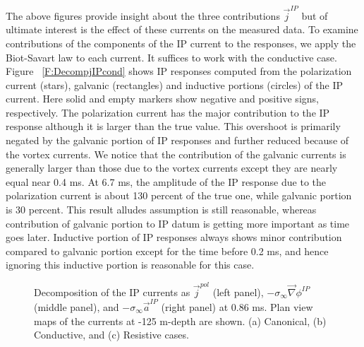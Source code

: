 \documentclass[extra,mreferee]{gji}
\newcommand{\grad}{\vec \nabla}
\newcommand{\siginf}{\sigma_\infty}
\renewcommand {\j}  { {\vec j} }
\begin{document}
The above figures provide insight about the three contributions $\j^{IP}$ but of ultimate interest is the effect of these currents on the measured data. 
To examine contributions of the components of the IP current to the responses, we apply the Biot-Savart law to each current. It suffices to work with the conductive case. 
Figure ~\ref{F:DecompjIPcond} shows IP responses computed from the polarization current (stars), galvanic (rectangles) and inductive portions (circles) of the IP current. Here solid and empty markers show negative and positive signs, respectively. 
The polarization current has the major contribution to the IP response although it is larger than the true value. This overshoot is primarily negated by the galvanic portion of IP responses and further reduced because of the vortex currents. We notice that the contribution of the galvanic currents is generally larger than those due to the vortex currents except they are nearly equal near 0.4 ms. 
At 6.7 ms, the amplitude of the  IP response due to the polarization current is about 130 percent of the true one, while galvanic portion is 30 percent. 
This result alludes \cite{Smith1988a} assumption is still reasonable, whereas contribution of galvanic portion to IP datum is getting more important as time goes later. 
Inductive portion of IP responses always shows minor contribution compared to galvanic portion except for the time before 0.2 ms, and hence ignoring this inductive portion is reasonable for this case. 

\begin{figure}
  \caption{Decomposition of the IP currents as $\j^{pol}$ (left panel), $-\siginf\grad \phi^{IP}$ (middle panel), and $-\siginf\vec{a}^{IP}$ (right panel) at 0.86 ms. Plan view maps of the currents at -125 m-depth are shown. (a) Canonical, (b) Conductive, and (c) Resistive cases. }
  \label{F:IPcurrents_helmholtz_early}
\end{figure}
\end{document}
